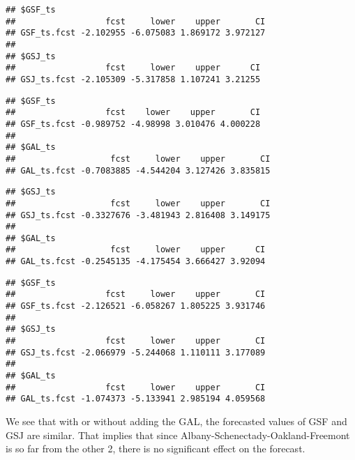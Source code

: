 \documentclass[]{article}
\newenvironment{Shaded}{\begin{snugshade}}{\end{snugshade}}
\newcommand{\KeywordTok}[1]{\textcolor[rgb]{0.13,0.29,0.53}{\textbf{#1}}}
\newcommand{\FloatTok}[1]{\textcolor[rgb]{0.00,0.00,0.81}{#1}}
\newcommand{\OperatorTok}[1]{\textcolor[rgb]{0.81,0.36,0.00}{\textbf{#1}}}
\newcommand{\NormalTok}[1]{#1}
\begin{document}
\begin{verbatim}
## $GSF_ts
##                  fcst     lower    upper       CI
## GSF_ts.fcst -2.102955 -6.075083 1.869172 3.972127
## 
## $GSJ_ts
##                  fcst     lower    upper      CI
## GSJ_ts.fcst -2.105309 -5.317858 1.107241 3.21255
\end{verbatim}

\begin{Shaded}
\end{Shaded}

\begin{verbatim}
## $GSF_ts
##                  fcst    lower    upper       CI
## GSF_ts.fcst -0.989752 -4.98998 3.010476 4.000228
## 
## $GAL_ts
##                   fcst     lower    upper       CI
## GAL_ts.fcst -0.7083885 -4.544204 3.127426 3.835815
\end{verbatim}

\begin{Shaded}
\end{Shaded}

\begin{verbatim}
## $GSJ_ts
##                   fcst     lower    upper       CI
## GSJ_ts.fcst -0.3327676 -3.481943 2.816408 3.149175
## 
## $GAL_ts
##                   fcst     lower    upper      CI
## GAL_ts.fcst -0.2545135 -4.175454 3.666427 3.92094
\end{verbatim}

\begin{Shaded}
\end{Shaded}

\begin{verbatim}
## $GSF_ts
##                  fcst     lower    upper       CI
## GSF_ts.fcst -2.126521 -6.058267 1.805225 3.931746
## 
## $GSJ_ts
##                  fcst     lower    upper       CI
## GSJ_ts.fcst -2.066979 -5.244068 1.110111 3.177089
## 
## $GAL_ts
##                  fcst     lower    upper       CI
## GAL_ts.fcst -1.074373 -5.133941 2.985194 4.059568
\end{verbatim}

We see that with or without adding the GAL, the forecasted values of GSF
and GSJ are similar. That implies that since
Albany-Schenectady-Oakland-Freemont is so far from the other 2, there is
no significant effect on the forecast.
\end{document}
